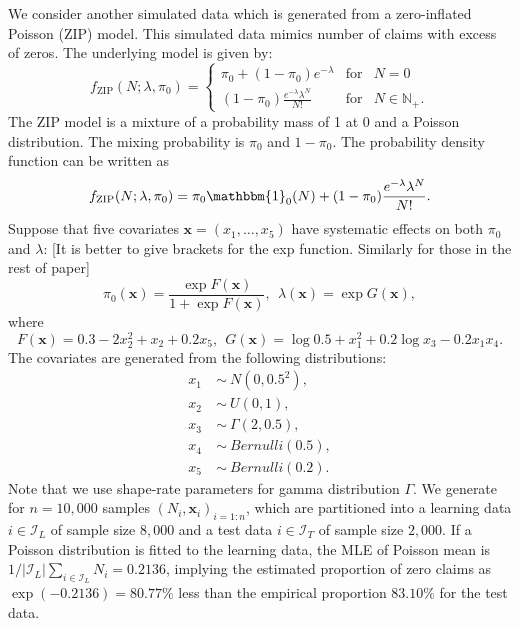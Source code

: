 \documentclass[11pt]{article}
\numberwithin{equation}{section}
\def\N{{\mathbb N}}  %
\def\bx{\boldsymbol{x}}
\begin{document}
We consider another simulated data which is generated from a zero-inflated Poisson (ZIP) model. This simulated data mimics number of claims with excess of zeros.
The underlying  model is given by:
\begin{equation}
	f_{\text{ZIP}}(N;\lambda,\pi_0) = \left\{ 
	\begin{array}{ccl}
		\pi_0+(1-\pi_0)e^{-\lambda} & \mbox{for}
		& N=0 \\
		(1-\pi_0)\frac{e^{-\lambda}\lambda^N}{N!} & \mbox{for} &N\in\N_+.
	\end{array}\right.
\end{equation}
The ZIP model is a mixture of a probability mass of 1 at 0 and a Poisson distribution. The mixing probability is $\pi_0$ and $1-\pi_0$.
The probability density function can be written as
$$f_\text{ZIP}(N;\lambda,\pi_0)= \pi_0\mathbbm{1}_{0}(N) + 
(1-\pi_0)\frac{e^{-\lambda}\lambda^N}{N!}.$$
Suppose that five covariates $\bx=(x_1,\ldots,x_5)$ have systematic effects on both $\pi_0$ and $\lambda$: {\color{blue}[It is better to give brackets for the exp function. Similarly for those in the rest of paper]}
\begin{equation}
	\pi_0(\bx)=\frac{\exp F(\bx)}{1+\exp F(\bx)}, ~~
	\lambda(\bx)=\exp G(\bx), 
\end{equation}
where
\begin{equation}
	F(\bx)=0.3-2x_2^2+x_2+0.2x_5, ~~G(\bx)=\log 0.5+x_1^2 + 0.2\log x_3 - 0.2x_1 x_4.
\end{equation}
The covariates are generated from the following distributions:
\begin{align*}
	x_1~&\sim~N(0,0.5^2),\\
	x_2~&\sim~U(0,1), \\
	x_3~&\sim~\Gamma(2,0.5), \\
	x_4~&\sim~Bernulli(0.5),\\
	x_5~&\sim~Bernulli(0.2).
\end{align*}
Note that we use shape-rate parameters for gamma distribution $\Gamma$.
We generate for $n=10,000$ samples $(N_i,\bx_i)_{i=1:n}$, which are partitioned into a learning data $i\in\mathcal{I}_{L}$ of sample size $8,000$ and a test data $i\in\mathcal{I}_{T}$ of sample size $2,000$. 
If a Poisson distribution is fitted to the learning data, the MLE of Poisson mean is $1/|\mathcal{I}_L|\sum_{i\in\mathcal{I}_L}N_i=0.2136$, implying the estimated proportion of zero claims as $\exp(-0.2136)=80.77\%$ less than the empirical proportion $83.10\%$ for the test data. 
\end{document}
